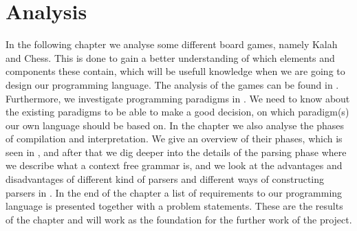 \chapter{Analysis}
In the following chapter we analyse some different board games, namely Kalah and Chess. This is done to gain a better understanding of which elements and components these contain, which will be usefull knowledge when we are going to design our programming language. The analysis of the games can be found in . Furthermore, we investigate programming paradigms in . We need to know about the existing paradigms to be able to make a good decision, on which paradigm(s) our own language should be based on. In the chapter we also analyse the phases of compilation and interpretation. We give an overview of their phases, which is seen in , and after that we dig deeper into the details of the parsing phase where we describe what a context free grammar is, and we look at the advantages and disadvantages of different kind of parsers and different ways of constructing parsers in . In the end of the chapter a list of requirements to our programming language is presented together with a problem statements. These are the results of the chapter and will work as the foundation for the further work of the project.









%


